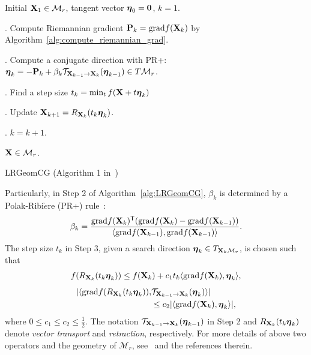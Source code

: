 \documentclass[10pt,twocolumn,letterpaper]{article}
\def\M{\mathcal{M}}
\def\trsp{{\sf T}}
\def\0{{\bf 0}}
\def\grad{{\text{grad}}}
\def\bfeta{\mbox{{\boldmath $\eta$}}}
\def\mT{{\mathcal T}}
\def\bX{{\bf X}}
\def\bX{{\bf X}}
\def\bP{{\bf P}}
\begin{document}
\begin{algorithm}
  \begin{algorithmic}
    \REQUIRE Initial $\bX_{1} \in \M_{r}$, tangent vector $\bfeta_{0} = \0$, $k = 1$.
    
      
      . Compute Riemannian gradient $\bP_{k} = \grad f(\bX_{k})$ by Algorithm~\ref{alg:compute_riemannian_grad}.
      
      . Compute a conjugate direction with PR+:
             $\bfeta_k = - \bP_{k} + \beta_{k} \mT_{\bX_{k-1} \rightarrow \bX_{k}}( \bfeta_{k-1}) \in T\M_{r}$.
             
      . Find a step size $t_{k} = \min_{t} f(\bX + t\bfeta_{k}) $

      . Update $\bX_{k+1} = R_{\bX_{k}}(t_{k} \bfeta_{k})$.
      
      . $k = k + 1$.
      
    \ENDWHILE

    \ENSURE $\bX \in \M_{r}$.

  \end{algorithmic}
  \caption{LRGeomCG (Algorithm 1 in~\cite{vandereycken2013lowrank})}
  \label{alg:LRGeomCG}
\end{algorithm}


Particularly, in Step 2 of Algorithm~\ref{alg:LRGeomCG}, $\beta_{k}$ is determined by a Polak-Ribi$\grave{e}$re (PR+) rule~\cite{vandereycken2013lowrank}:
{\small
\begin{eqnarray}\label{eq:beta}
\beta_{k} = \frac{\grad f(\bX_{k})^{\trsp}(\grad f(\bX_{k}) - \grad f(\bX_{k-1}))}{\langle \grad f(\bX_{k-1}),\grad f(\bX_{k-1})\rangle}.
\end{eqnarray}
}
\noindent
The step size $t_{k}$ in Step 3, given a search direction $\bfeta_{k} \in T_{\bX_{k} \M_{r}}$, is chosen such that
{\small
\begin{align}\label{eq:choose_step_size}
  f(R_{\bX_{k}} (t_{k} \bfeta_{k})) \leq f(\bX_{k}) + c_{1} t_{k} \langle \grad f(\bX_{k}), \bfeta_{k} \rangle ,
\end{align}
}
{\small
\begin{align}\label{eq+choose_step_size2}
  | \langle \grad f(R_{\bX_{k}} (t_{k} \bfeta_{k})), & \mT_{\bX_{k-1} \rightarrow \bX_{k}} (\bfeta_{k}) \rangle |  \nonumber \\
                           & \leq c_{2} | \langle \grad f(\bX_{k}), \bfeta_{k} \rangle |  ,
\end{align}
}
\noindent
where $0 \leq c_{1} \leq c_{2} \leq \frac{1}{2}$.
The notation $\mT_{\bX_{k-1} \rightarrow \bX_{k}} (\bfeta_{k-1})$ in Step 2 and $R_{\bX_{k}} (t_k \bfeta_{k})$ denote \emph{vector transport} and \emph{retraction}, respectively.
For more details of above two operators and the geometry of $\M_{r}$, see~\cite{vandereycken2013lowrank} and the references therein.
\end{document}
